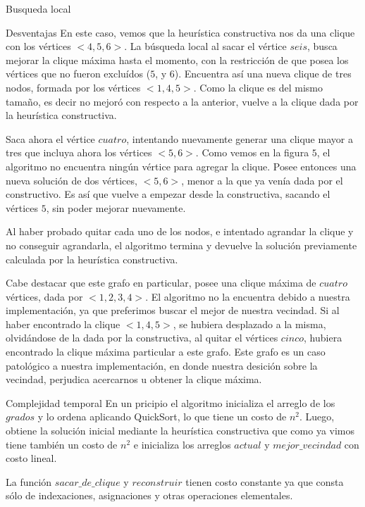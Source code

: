 \begin{section}{Busqueda local}
\begin{subsection}{Desventajas}
		En este caso, vemos que la heurística constructiva nos da una clique con los vértices $<4,5,6>$. La búsqueda local al sacar el vértice $seis$, busca mejorar la clique máxima hasta el momento, con la restricción de que posea los vértices que no fueron excluídos ($5$, y $6$). Encuentra así una nueva clique de tres nodos, formada por los vértices $<1,4,5>$. Como la clique es del mismo tamaño, es decir no mejoró con respecto a la anterior, vuelve a la clique dada por la heurística constructiva.

		Saca ahora el vértice $cuatro$, intentando nuevamente generar una clique mayor a tres que incluya ahora los vértices $<5,6>$. Como vemos en la figura $5$, el algoritmo no encuentra ningún vértice para agregar la clique. Posee entonces una nueva solución de dos vértices, $<5,6>$, menor a la que ya venía dada por el constructivo. Es así que vuelve a empezar desde la constructiva, sacando el vértices $5$, sin poder mejorar nuevamente.

		Al haber probado quitar cada uno de los nodos, e intentado agrandar la clique y no conseguir agrandarla, el algoritmo termina y devuelve la solución previamente calculada por la heurística constructiva.

		Cabe destacar que este grafo en particular, posee una clique máxima de $cuatro$ vértices, dada por $<1,2,3,4>$. El algoritmo no la encuentra debido a nuestra implementación, ya que preferimos buscar el mejor de nuestra vecindad. Si al haber encontrado la clique $<1,4,5>$, se hubiera desplazado a la misma, olvidándose de la dada por la constructiva, al quitar el vértices $cinco$, hubiera encontrado la clique máxima particular a este grafo. Este grafo es un caso patológico a nuestra implementación, en donde nuestra desición sobre la vecindad, perjudica acercarnos u obtener la clique máxima.

		\end{subsection}
		\begin{subsection}{Complejidad temporal}
			En un pricipio el algoritmo inicializa el arreglo de los $grados$ y lo ordena aplicando QuickSort, lo que tiene un costo de $n^2$. Luego, obtiene la solución inicial mediante la heurística constructiva que como ya vimos tiene también un costo de $n^2$ e inicializa los arreglos $actual$ y $mejor\_vecindad$ con costo lineal.

			La función $sacar\_de\_clique$ y $reconstruir$ tienen costo constante ya que consta sólo de indexaciones, asignaciones y otras operaciones elementales.


\end{subsection}
\end{section}
